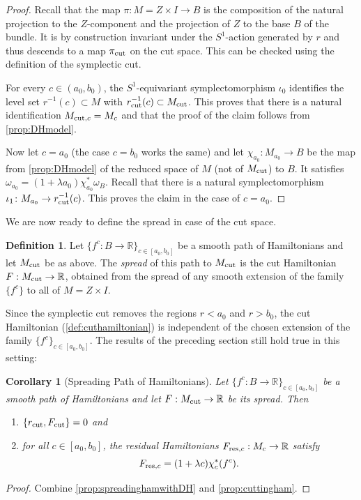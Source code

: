 \documentclass[10pt,oneside,reqno]{amsart}
\newtheorem{corollary}[theorem]{Corollary}
\theoremstyle{definition}
\newtheorem{definition}[theorem]{Definition}
\newcommand{\IR}{\mathbb{R}}
\newcommand{\resc}{{\textup{res},c}}
\newcommand{\cut}{\textup{cut}}
\begin{document}
\begin{proof}
    Recall that the map $\pi \colon M = Z \times I\to B$ is the composition of the natural projection to the $Z$-component and the projection of $Z$ to the base $B$ of the bundle. It is by construction invariant under the $S^1$-action generated by $r$ and thus descends to a map $\pi_\cut$ on the cut space. This can be checked using the definition of the symplectic cut. 

    For every $c \in (a_0,b_0)$, the $S^1$-equivariant symplectomorphism $\iota_0$ identifies the level set $r^{-1}(c) \subset M$ with $r_\cut^{-1}(c) \subset M_\cut$. This proves that there is a natural identification $M_{\cut,c} = M_c$ and that the proof of the claim follows from \cref{prop:DHmodel}. 

    Now let $c = a_0$ (the case $c=b_0$ works the same) and let $\chi_{a_0} \colon M_{a_0} \rightarrow B$ be the map from \cref{prop:DHmodel} of the reduced space of $M$ (not of $M_\cut$) to $B$. It satisfies $\omega_{a_0}=(1+\lambda a_0)\chi_{a_0}^* \omega_B$. Recall that there is a natural symplectomorphism $\iota_1 \colon M_{a_0} \rightarrow r_\cut^{-1}(c)$. This proves the claim in the case of $c = a_0$. 
\end{proof}

We are now ready to define the spread in case of the cut space. 

\begin{definition}
    Let $\{ f^c:B\to \IR\}_{c\in [a_0,b_0]}$ be a smooth path of Hamiltonians and let $M_\cut$ be as above. The \textit{spread} of this path to $M_\cut$ is the cut Hamiltonian $F:M_\cut \to \IR$, obtained from the spread of any smooth extension of the family $\{f^c\}$ to all of $M = Z \times I$.
\end{definition}

Since the symplectic cut removes the regions $r<a_0$ and $r>b_0$, the cut
Hamiltonian (\cref{def:cuthamiltonian}) is independent of the chosen extension of the
family $\{f^c\}_{c\in[a_0,b_0]}$. The results of the preceding section still hold true in this setting:
\begin{corollary}[Spreading Path of Hamiltonians]
     Let $\{ f^c:B\to \IR\}_{c\in [a_0,b_0]}$ be a smooth path of Hamiltonians and let $F:M_\cut \to \IR$ be its spread. Then
     \begin{enumerate}
         \item $\{r_\cut,F_\cut\}=0 $ and 
         \item for all $c\in [a_0,b_0]$, the residual Hamiltonians $F_\resc:M_c\to \IR$ satisfy
         \begin{equation*}
             F_\resc = (1+\lambda c)\chi_c^*(f^c).
         \end{equation*}
     \end{enumerate}
\end{corollary}
\begin{proof}
    Combine \cref{prop:spreadinghamwithDH} and \cref{prop:cuttingham}.
\end{proof}
\end{document}
